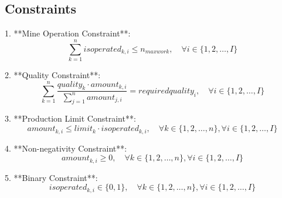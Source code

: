\documentclass{article}
\begin{document}
\subsection*{Constraints}
1. **Mine Operation Constraint**:
   \[
   \sum_{k=1}^{n} isoperated_{k,i} \leq n_{maxwork}, \quad \forall i \in \{1, 2, \ldots, I\}
   \]

2. **Quality Constraint**:
   \[
   \sum_{k=1}^{n} \frac{quality_k \cdot amount_{k,i}}{\sum_{j=1}^{n} amount_{j,i}} = requiredquality_i, \quad \forall i \in \{1, 2, \ldots, I\}
   \]

3. **Production Limit Constraint**:
   \[
   amount_{k,i} \leq limit_k \cdot isoperated_{k,i}, \quad \forall k \in \{1, 2, \ldots, n\}, \forall i \in \{1, 2, \ldots, I\}
   \]

4. **Non-negativity Constraint**:
   \[
   amount_{k,i} \geq 0, \quad \forall k \in \{1, 2, \ldots, n\}, \forall i \in \{1, 2, \ldots, I\}
   \]

5. **Binary Constraint**:
   \[
   isoperated_{k,i} \in \{0, 1\}, \quad \forall k \in \{1, 2, \ldots, n\}, \forall i \in \{1, 2, \ldots, I\}
   \]
\end{document}
